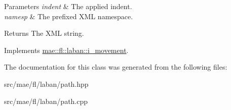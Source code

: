 \begin{DoxyParams}{Parameters}
{\em indent} & The applied indent. \\
\hline
{\em namesp} & The prefixed X\-M\-L namespace.\\
\hline
\end{DoxyParams}
\begin{DoxyReturn}{Returns}
The X\-M\-L string. 
\end{DoxyReturn}


Implements \hyperlink{classmae_1_1fl_1_1laban_1_1i__movement_acd832b2a6976bfe32eae4bece01ee8f3}{mae\-::fl\-::laban\-::i\-\_\-movement}.



The documentation for this class was generated from the following files\-:\begin{DoxyCompactItemize}
\item 
src/mae/fl/laban/path.\-hpp\item 
src/mae/fl/laban/path.\-cpp\end{DoxyCompactItemize}
